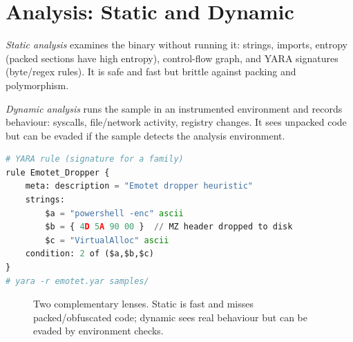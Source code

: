 \section{Analysis: Static and Dynamic}
\label{sec:analysis}
\emph{Static analysis} examines the binary without running it: strings, imports, entropy (packed sections have high entropy), control-flow graph, and YARA signatures (byte/regex rules). It is safe and fast but brittle against packing and polymorphism.

\emph{Dynamic analysis} runs the sample in an instrumented environment and records behaviour: syscalls, file/network activity, registry changes. It sees unpacked code but can be evaded if the sample detects the analysis environment.

\begin{lstlisting}[language=Python]
# YARA rule (signature for a family)
rule Emotet_Dropper {
    meta: description = "Emotet dropper heuristic"
    strings:
        $a = "powershell -enc" ascii
        $b = { 4D 5A 90 00 }  // MZ header dropped to disk
        $c = "VirtualAlloc" ascii
    condition: 2 of ($a,$b,$c)
}
# yara -r emotet.yar samples/
\end{lstlisting}

\begin{figure}[h]\centering
{}
\caption{Two complementary lenses. Static is fast and misses packed/obfuscated code; dynamic sees real behaviour but can be evaded by environment checks.}
\label{fig:static-dynamic}
\end{figure}

